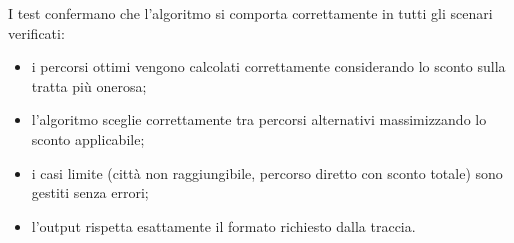 I test confermano che l'algoritmo si comporta correttamente 
in tutti gli scenari verificati:

\begin{itemize}
    \item i percorsi ottimi vengono calcolati correttamente 
    considerando lo sconto sulla tratta più onerosa;
    \item l'algoritmo sceglie correttamente tra percorsi alternativi 
    massimizzando lo sconto applicabile;
    \item i casi limite (città non raggiungibile, percorso diretto 
    con sconto totale) sono gestiti senza errori;
    \item l'output rispetta esattamente il formato richiesto 
    dalla traccia.
\end{itemize}